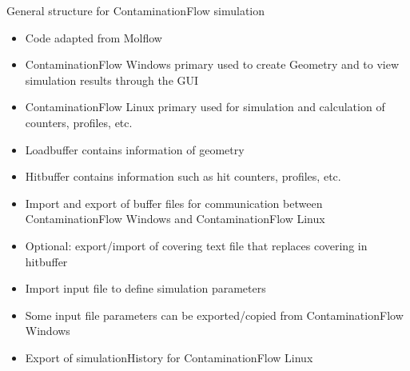 \begin{center}
\end{center}
\vspace{1cm}
General structure for ContaminationFlow simulation
\begin{itemize}[noitemsep,topsep=2pt]
\item Code adapted from Molflow
\item ContaminationFlow Windows primary used to create Geometry and to view simulation results through the GUI
\item ContaminationFlow Linux primary used for simulation and calculation of counters, profiles, etc.
\item Loadbuffer contains information of geometry
\item Hitbuffer contains information such as hit counters, profiles, etc.
\item Import and export of buffer files for communication between ContaminationFlow Windows and ContaminationFlow Linux
\item Optional: export/import of covering text file that replaces covering in hitbuffer
\item Import input file to define simulation parameters
\item Some input file parameters can be exported/copied from ContaminationFlow Windows
\item Export of simulationHistory for ContaminationFlow Linux
\end{itemize}
